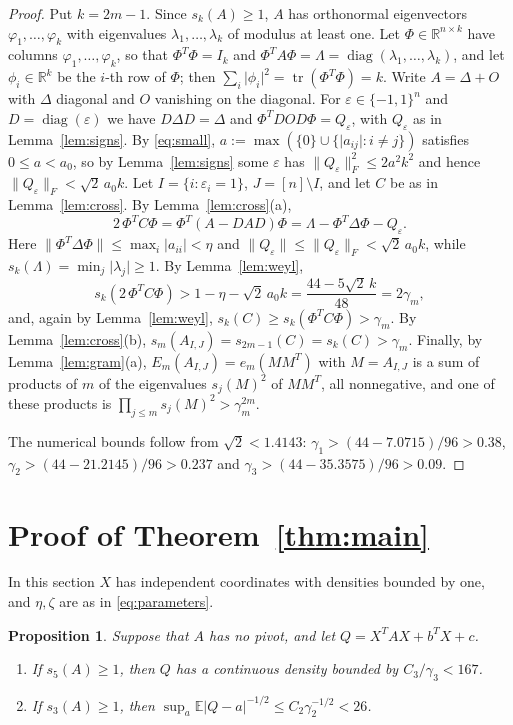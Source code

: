 \documentclass[11pt]{amsart}
\numberwithin{equation}{section}
\newtheorem{proposition}[theorem]{Proposition}
\theoremstyle{definition}
\theoremstyle{remark}
\newcommand{\R}{\mathbb R}
\newcommand{\E}{\mathbb E}
\newcommand{\1}{\mathbf 1}
\DeclareMathOperator{\diag}{diag}
\DeclareMathOperator{\tr}{tr}
\newcommand{\norm}[1]{\lVert #1\rVert}
\newcommand{\abs}[1]{\lvert #1\rvert}
\begin{document}
\begin{proof}
Put $k=2m-1$. Since $s_k(A)\ge1$, $A$ has orthonormal eigenvectors $\varphi_1,\dots,\varphi_k$ with eigenvalues $\lambda_1,\dots,\lambda_k$ of modulus at least one. Let $\Phi\in\R^{n\times k}$ have columns $\varphi_1,\dots,\varphi_k$, so that $\Phi^T\Phi=I_k$ and $\Phi^TA\Phi=\Lambda=\diag(\lambda_1,\dots,\lambda_k)$, and let $\phi_i\in\R^k$ be the $i$-th row of $\Phi$; then $\sum_i\abs{\phi_i}^2=\tr(\Phi^T\Phi)=k$. Write $A=\Delta+O$ with $\Delta$ diagonal and $O$ vanishing on the diagonal. For $\varepsilon\in\{-1,1\}^n$ and $D=\diag(\varepsilon)$ we have $D\Delta D=\Delta$ and $\Phi^TDOD\Phi=Q_\varepsilon$, with $Q_\varepsilon$ as in Lemma~\ref{lem:signs}. By \eqref{eq:small}, $a:=\max(\{0\}\cup\{\abs{a_{ij}}:i\ne j\})$ satisfies $0\le a<a_0$, so by Lemma~\ref{lem:signs} some $\varepsilon$ has $\norm{Q_\varepsilon}_F^2\le2a^2k^2$ and hence $\norm{Q_\varepsilon}_F<\sqrt2\,a_0k$. Let $I=\{i:\varepsilon_i=1\}$, $J=[n]\setminus I$, and let $C$ be as in Lemma~\ref{lem:cross}. By Lemma~\ref{lem:cross}(a),
\[
2\,\Phi^TC\Phi=\Phi^T(A-DAD)\Phi=\Lambda-\Phi^T\Delta\Phi-Q_\varepsilon .
\]
Here $\norm{\Phi^T\Delta\Phi}\le\max_i\abs{a_{ii}}<\eta$ and $\norm{Q_\varepsilon}\le\norm{Q_\varepsilon}_F<\sqrt2\,a_0k$, while $s_k(\Lambda)=\min_j\abs{\lambda_j}\ge1$. By Lemma~\ref{lem:weyl},
\[
s_k(2\,\Phi^TC\Phi)>1-\eta-\sqrt2\,a_0k=\frac{44-5\sqrt2\,k}{48}=2\gamma_m ,
\]
and, again by Lemma~\ref{lem:weyl}, $s_k(C)\ge s_k(\Phi^TC\Phi)>\gamma_m$. By Lemma~\ref{lem:cross}(b), $s_m(A_{I,J})=s_{2m-1}(C)=s_k(C)>\gamma_m$. Finally, by Lemma~\ref{lem:gram}(a), $E_m(A_{I,J})=e_m(MM^T)$ with $M=A_{I,J}$ is a sum of products of $m$ of the eigenvalues $s_j(M)^2$ of $MM^T$, all nonnegative, and one of these products is $\prod_{j\le m}s_j(M)^2>\gamma_m^{2m}$.

The numerical bounds follow from $\sqrt2<1.4143$: $\gamma_1>(44-7.0715)/96>0.38$, $\gamma_2>(44-21.2145)/96>0.237$ and $\gamma_3>(44-35.3575)/96>0.09$.
\end{proof}

\section{Proof of Theorem~\ref{thm:main}}\label{sec:proof}

In this section $X$ has independent coordinates with densities bounded by one, and $\eta,\zeta$ are as in \eqref{eq:parameters}.

\begin{proposition}\label{prop:nopivot}
Suppose that $A$ has no pivot, and let $Q=X^TAX+b^TX+c$.
\begin{enumerate}
\item[(a)] If $s_5(A)\ge1$, then $Q$ has a continuous density bounded by $C_3/\gamma_3<167$.
\item[(b)] If $s_3(A)\ge1$, then $\sup_a\E\abs{Q-a}^{-1/2}\le C_2\gamma_2^{-1/2}<26$.
\end{enumerate}
\end{proposition}
\end{document}
